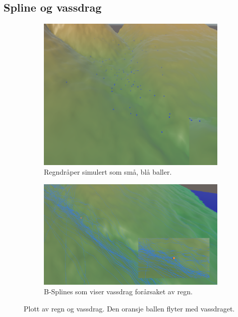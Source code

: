 \documentclass[norsk, doc, 11pt, a4paper]{apa7}  %
\begin{document}
\subsection{Spline og vassdrag} \label{fig:regn}
\begin{figure}[H]
	\centering
	\begin{subfigure}{.5\textwidth}
		\centering
		\includegraphics[width=.9\linewidth]{figs/rain.png}
		\caption{Regndråper simulert som små, blå baller.}
	\end{subfigure}%
	\begin{subfigure}{.5\textwidth}
		\centering
		\includegraphics[width=\linewidth]{figs/water.png}
		\caption{B-Splines som viser vassdrag forårsaket av regn.}
	\end{subfigure}
	\caption{Plott av regn og vassdrag. Den oransje ballen flyter med vassdraget.}
\end{figure}
\end{document}
